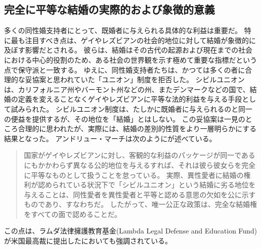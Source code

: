 \documentclass[paper=a4,book,openany]{jlreq}
\begin{document}
\subsection{完全に平等な結婚の実際的および象徴的意義}

多くの同性婚支持者にとって、既婚者に与えられる具体的な利益は重要だ。
特に最も注目すべき点は、ゲイやレズビアンの社会的地位に対して結婚が象徴的に及ぼす影響だとされる。
彼らは、結婚はその古代の起源および現在までの社会における中心的役割のため、ある社会の世界観を示す極めて重要な指標だという点で保守派と一致する。
ゆえに、同性婚支持者たちは、かつては多くの者に合理的な妥協案と思われていた「ユニオン」制度を拒否した。
シビルユニオンは、カリフォルニア州やバーモント州などの州、またデンマークなどの国で、結婚の定義を変えることなくゲイやレズビアンに平等な法的利益を与える手段として試みられた。
シビルユニオン制度は、たしかに既婚者に与えられるのと同一の便益を提供するが、その地位を「結婚」とはしない。
この妥協案は一見のところ合理的に思われたが、実際には、結婚の差別的性質をより一層明らかにする結果となった。
アンドリュー・マーチは次のようにが述べている。

\begin{quote}
国家がゲイやレズビアンに対し、客観的な利益のパッケージが同一であるにもかかわらず異なる公的地位を与えるすれば、それは彼ら彼女らを完全に平等なものとして扱うことを怠っている。
実際、異性愛者に結婚の権利が認められている状況下で「シビルユニオン」という結婚に劣る地位を与えることは、同性愛者を異性愛者と平等と認める意思の欠如を公に示すものであり、すなわちだ。
したがって、唯一公正な政策は、完全な結婚権をすべての面で認めることだ。\citep[p.254]{march11:_is_there_right_polyg}
\end{quote}

この点は、ラムダ法律擁護教育基金(Lambda Legal Defense and Education Fund)が米国最高裁に提出したにおいても強調されている。
\end{document}
